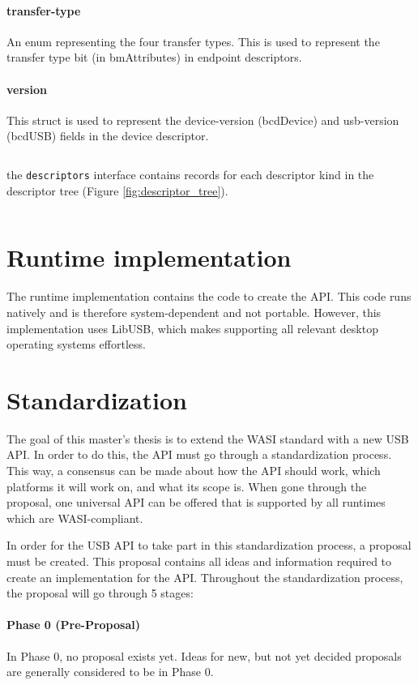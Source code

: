 \paragraph{transfer-type}
An enum representing the four transfer types. This is used to represent the transfer type bit (in bmAttributes) in endpoint descriptors.

\paragraph{version}
This struct is used to represent the device-version (bcdDevice) and usb-version (bcdUSB) fields in the device descriptor.

\inputminted{yaml}{wit/descriptors.wit}

the \texttt{descriptors} interface contains records for each descriptor kind in the descriptor tree (Figure \ref{fig:descriptor_tree}).

\inputminted{yaml}{wit/device.wit}

\section{Runtime implementation}
The runtime implementation contains the code to create the API. This code runs natively and is therefore system-dependent and not portable. However, this implementation uses LibUSB, which makes supporting all relevant desktop operating systems effortless.

\section{Standardization}
The goal of this master's thesis is to extend the WASI standard with a new USB API. In order to do this, the API must go through a standardization process. This way, a consensus can be made about how the API should work, which platforms it will work on, and what its scope is. When gone through the proposal, one universal API can be offered that is supported by all runtimes which are WASI-compliant.

In order for the USB API to take part in this standardization process, a proposal must be created. This proposal contains all ideas and information required to create an implementation for the API. Throughout the standardization process, the proposal will go through 5 stages:

\paragraph{Phase 0 (Pre-Proposal)}
In Phase 0, no proposal exists yet. Ideas for new, but not yet decided proposals are generally considered to be in Phase 0.

